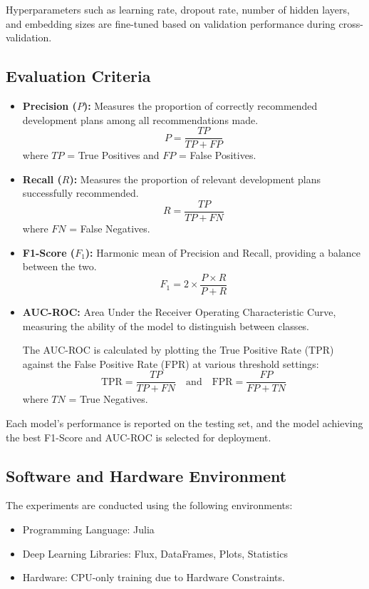 Hyperparameters such as learning rate, dropout rate, number of hidden layers, and embedding sizes are fine-tuned based on validation performance during cross-validation.

\subsection{Evaluation Criteria}
\begin{itemize}
    \item \textbf{Precision ($P$):} Measures the proportion of correctly recommended development plans among all recommendations made.
    \[
    P = \frac{TP}{TP + FP}
    \]
    where $TP$ = True Positives and $FP$ = False Positives.

    \item \textbf{Recall ($R$):} Measures the proportion of relevant development plans successfully recommended.
    \[
    R = \frac{TP}{TP + FN}
    \]
    where $FN$ = False Negatives.

    \item \textbf{F1-Score ($F_1$):} Harmonic mean of Precision and Recall, providing a balance between the two.
    \[
    F_1 = 2 \times \frac{P \times R}{P + R}
    \]

    \item \textbf{AUC-ROC:} Area Under the Receiver Operating Characteristic Curve, measuring the ability of the model to distinguish between classes.

    The AUC-ROC is calculated by plotting the True Positive Rate (TPR) against the False Positive Rate (FPR) at various threshold settings:
    \[
    \text{TPR} = \frac{TP}{TP + FN}
    \quad \text{and} \quad
    \text{FPR} = \frac{FP}{FP + TN}
    \]
    where $TN$ = True Negatives.
\end{itemize}


Each model’s performance is reported on the testing set, and the model achieving the best F1-Score and AUC-ROC is selected for deployment.

\subsection{Software and Hardware Environment}
The experiments are conducted using the following environments:
\begin{itemize}
    \item Programming Language: Julia
    \item Deep Learning Libraries: Flux, DataFrames, Plots, Statistics
    \item Hardware: CPU-only training due to Hardware Constraints.
\end{itemize}

